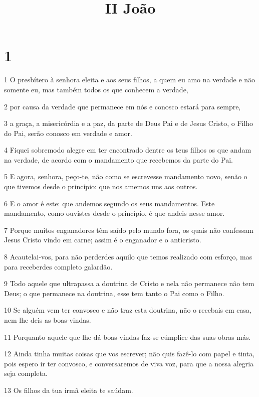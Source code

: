 

\title{II João}


\chapter{1}

\par 1 O presbítero à senhora eleita e aos seus filhos, a quem eu amo na verdade e não somente eu, mas também todos os que conhecem a verdade,
\par 2 por causa da verdade que permanece em nós e conosco estará para sempre,
\par 3 a graça, a misericórdia e a paz, da parte de Deus Pai e de Jesus Cristo, o Filho do Pai, serão conosco em verdade e amor.
\par 4 Fiquei sobremodo alegre em ter encontrado dentre os teus filhos os que andam na verdade, de acordo com o mandamento que recebemos da parte do Pai.
\par 5 E agora, senhora, peço-te, não como se escrevesse mandamento novo, senão o que tivemos desde o princípio: que nos amemos uns aos outros.
\par 6 E o amor é este: que andemos segundo os seus mandamentos. Este mandamento, como ouvistes desde o princípio, é que andeis nesse amor.
\par 7 Porque muitos enganadores têm saído pelo mundo fora, os quais não confessam Jesus Cristo vindo em carne; assim é o enganador e o anticristo.
\par 8 Acautelai-vos, para não perderdes aquilo que temos realizado com esforço, mas para receberdes completo galardão.
\par 9 Todo aquele que ultrapassa a doutrina de Cristo e nela não permanece não tem Deus; o que permanece na doutrina, esse tem tanto o Pai como o Filho.
\par 10 Se alguém vem ter convosco e não traz esta doutrina, não o recebais em casa, nem lhe deis as boas-vindas.
\par 11 Porquanto aquele que lhe dá boas-vindas faz-se cúmplice das suas obras más.
\par 12 Ainda tinha muitas coisas que vos escrever; não quis fazê-lo com papel e tinta, pois espero ir ter convosco, e conversaremos de viva voz, para que a nossa alegria seja completa.
\par 13 Os filhos da tua irmã eleita te saúdam.


